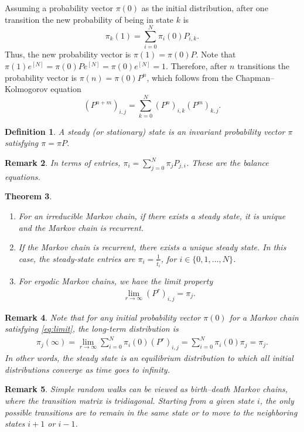 \documentclass[11pt]{amsart}
\theoremstyle{plain}
\newtheorem{teo}{Theorem}[section]
\newtheorem{defi}[teo]{Definition}
\newtheorem{rem}[teo]{Remark}
\newcommand{\1}{\text{\fontseries{bx}\selectfont \textup 1}}
\begin{document}
Assuming a probability vector ${\pi}(0)$ as the initial distribution, after one transition the new probability of being in state $k$ is
\[
\pi_k(1)=\sum_{i=0}^{N}\pi_i(0)P_{i,k}.
\]
Thus, the new probability vector is $\pi(1)=\pi(0)P$. Note that $\pi(1) e^{[N]}=\pi(0)P e^{[N]}=\pi(0) e^{[N]}=1$.
Therefore, after $n$ transitions the probability vector is ${\pi}(n)={\pi}(0 )P^n$, which follows from the Chapman--Kolmogorov equation
\[
(P^{n+m})_{i,j}=\sum_{k=0}^{N} (P^{n})_{i,k}(P^{m})_{k,j}.
\]

\begin{defi}
	A steady (or stationary) state is an invariant probability vector ${\pi}$ satisfying ${\pi}= \pi P$.
\end{defi}

\begin{rem}
	In terms of entries, $\pi_i=\sum_{j=0}^{N}\pi_j P_{j,i}$. These are the balance equations.
\end{rem}

\begin{teo}
	\begin{enumerate}
		\item For an irreducible Markov chain, if there exists a steady state, it is unique and the Markov chain is recurrent.
		\item If the Markov chain is recurrent, there exists a unique steady state. In this case, the steady-state entries are $\pi_i=\frac{1}{\bar t_i}$, for $ i\in\{0,1,\ldots,N\}$.
		\item For ergodic Markov chains, we have the limit property
		\begin{align}\label{eq:limit}
			\lim_{r\to\infty}(P^r)_{i,j}=\pi_j.
		\end{align}
	\end{enumerate}
\end{teo}

\begin{rem}
	Note that for any initial probability vector $\pi(0)$ for a Markov chain satisfying \eqref{eq:limit}, the long-term distribution is
	\begin{align*}
		\pi_j(\infty)=\lim_{r\to\infty} \sum_{i=0}^{N}\pi_i(0)(P^r)_{i,j}
		=\sum_{i=0}^{N}\pi_i(0)\pi_j=\pi_j.
	\end{align*}
	In other words, the steady state is an equilibrium distribution to which all initial distributions converge as time goes to infinity.
\end{rem}

\begin{rem}
	Simple random walks can be viewed as birth--death Markov chains, where the transition matrix is tridiagonal. Starting from a given state $i$, the only possible transitions are to remain in the same state or to move to the neighboring states $i+1$ or $i-1$.
\end{rem}
\end{document}
